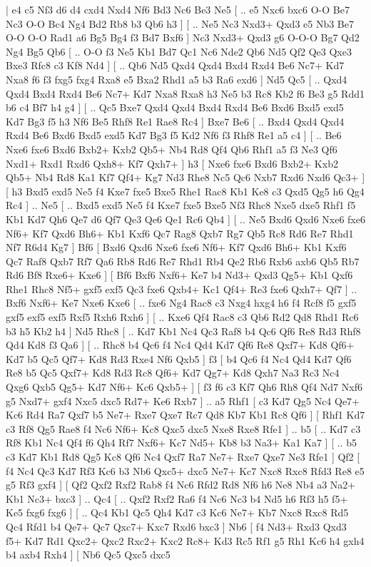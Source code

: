 \makegametitle 
|   e4   c5    Nf3   d6    d4   cxd4    Nxd4   Nf6    Bd3   Nc6    Be3   Ne5 [ .. e5  Nxc6 bxc6  O-O Be7  Nc3 O-O  Bc4 Ng4  Bd2 Rb8  b3 Qb6  h3   ]  [ .. Ne5  Nc3 Nxd3+  Qxd3 e5  Nb3 Be7  O-O O-O  Rad1 a6  Bg5 Bg4  f3 Bd7  Bxf6   ]  Nc3   Nxd3+    Qxd3   g6    O-O-O   Bg7    Qd2   Ng4    Bg5   Qb6 [ .. O-O  f3 Ne5  Kb1 Bd7  Qc1 Nc6  Nde2 Qb6  Nd5 Qf2  Qe3 Qxe3  Bxe3 Rfc8  c3 Kf8  Nd4   ]  [ .. Qb6  Nd5 Qxd4  Qxd4 Bxd4  Rxd4 Be6  Nc7+ Kd7  Nxa8 f6  f3 fxg5  fxg4 Rxa8  e5 Bxa2  Rhd1 a5  b3 Ra6  exd6   ]  Nd5   Qc5 [ .. Qxd4  Qxd4 Bxd4  Rxd4 Be6  Nc7+ Kd7  Nxa8 Rxa8  h3 Ne5  b3 Rc8  Kb2 f6  Be3 g5  Rdd1 b6  c4 Bf7  h4 g4   ]  [ .. Qc5  Bxe7 Qxd4  Qxd4 Bxd4  Rxd4 Be6  Bxd6 Bxd5  exd5 Kd7  Bg3 f5  h3 Nf6  Be5 Rhf8  Re1 Rae8  Rc4   ]  Bxe7   Be6 [ .. Bxd4  Qxd4 Qxd4  Rxd4 Be6  Bxd6 Bxd5  exd5 Kd7  Bg3 f5  Kd2 Nf6  f3 Rhf8  Re1 a5  c4   ]  [ .. Be6  Nxe6 fxe6  Bxd6 Bxb2+  Kxb2 Qb5+  Nb4 Rd8  Qf4 Qb6  Rhf1 a5  f3 Ne3  Qf6 Nxd1+  Rxd1 Rxd6  Qxh8+ Kf7  Qxh7+   ]  h3 [  Nxe6 fxe6  Bxd6 Bxb2+  Kxb2 Qb5+  Nb4 Rd8  Ka1 Kf7  Qf4+ Kg7  Nd3 Rhe8  Nc5 Qc6  Nxb7 Rxd6  Nxd6 Qc3+   ]  [  h3 Bxd5  exd5 Ne5  f4 Kxe7  fxe5 Bxe5  Rhe1 Rac8  Kb1 Ke8  c3 Qxd5  Qg5 h6  Qg4 Rc4   ] .. Ne5 [ .. Bxd5  exd5 Ne5  f4 Kxe7  fxe5 Bxe5  Nf3 Rhc8  Nxe5 dxe5  Rhf1 f5  Kb1 Kd7  Qh6 Qe7  d6 Qf7  Qe3 Qe6  Qe1 Rc6  Qb4   ]  [ .. Ne5  Bxd6 Qxd6  Nxe6 fxe6  Nf6+ Kf7  Qxd6 Bh6+  Kb1 Kxf6  Qc7 Rag8  Qxb7 Rg7  Qb5 Rc8  Rd6 Re7  Rhd1 Nf7  R6d4 Kg7   ]  Bf6 [  Bxd6 Qxd6  Nxe6 fxe6  Nf6+ Kf7  Qxd6 Bh6+  Kb1 Kxf6  Qc7 Raf8  Qxb7 Rf7  Qa6 Rb8  Rd6 Re7  Rhd1 Rb4  Qe2 Rb6  Rxb6 axb6  Qb5 Rb7  Rd6 Bf8  Rxe6+ Kxe6   ]  [  Bf6 Bxf6  Nxf6+ Ke7  b4 Nd3+  Qxd3 Qg5+  Kb1 Qxf6  Rhe1 Rhc8  Nf5+ gxf5  exf5 Qc3  fxe6 Qxb4+  Kc1 Qf4+  Re3 fxe6  Qxh7+ Qf7   ] .. Bxf6    Nxf6+   Ke7    Nxe6   Kxe6 [ .. fxe6  Ng4 Rac8  c3 Nxg4  hxg4 h6  f4 Rcf8  f5 gxf5  gxf5 exf5  exf5 Rxf5  Rxh6 Rxh6   ]  [ .. Kxe6  Qf4 Rac8  c3 Qb6  Rd2 Qd8  Rhd1 Rc6  b3 h5  Kb2 h4   ]  Nd5   Rhc8 [ .. Kd7  Kb1 Nc4  Qc3 Raf8  b4 Qc6  Qf6 Re8  Rd3 Rhf8  Qd4 Kd8  f3 Qa6   ]  [ .. Rhc8  b4 Qc6  f4 Nc4  Qd4 Kd7  Qf6 Re8  Qxf7+ Kd8  Qf6+ Kd7  b5 Qc5  Qf7+ Kd8  Rd3 Rxe4  Nf6 Qxb5   ]  f3 [  b4 Qc6  f4 Nc4  Qd4 Kd7  Qf6 Re8  b5 Qc5  Qxf7+ Kd8  Rd3 Rc8  Qf6+ Kd7  Qg7+ Kd8  Qxh7 Na3  Rc3 Nc4  Qxg6 Qxb5  Qg5+ Kd7  Nf6+ Kc6  Qxb5+   ]  [  f3 f6  c3 Kf7  Qh6 Rh8  Qf4 Nd7  Nxf6 g5  Nxd7+ gxf4  Nxc5 dxc5  Rd7+ Ke6  Rxb7   ] .. a5    Rhf1 [  c3 Kd7  Qg5 Nc4  Qe7+ Kc6  Rd4 Ra7  Qxf7 b5  Ne7+ Rxe7  Qxe7 Rc7  Qd8 Kb7  Kb1 Rc8  Qf6   ]  [  Rhf1 Kd7  c3 Rf8  Qg5 Rae8  f4 Nc6  Nf6+ Kc8  Qxc5 dxc5  Nxe8 Rxe8  Rfe1   ] .. b5 [ .. Kd7  c3 Rf8  Kb1 Nc4  Qf4 f6  Qh4 Rf7  Nxf6+ Kc7  Nd5+ Kb8  b3 Na3+  Ka1 Ka7   ]  [ .. b5  c3 Kd7  Kb1 Rd8  Qg5 Kc8  Qf6 Nc4  Qxf7 Ra7  Ne7+ Rxe7  Qxe7 Ne3  Rfe1   ]  Qf2 [  f4 Nc4  Qc3 Kd7  Rf3 Kc6  b3 Nb6  Qxc5+ dxc5  Ne7+ Kc7  Nxc8 Rxc8  Rfd3 Re8  e5 g5  Rf3 gxf4   ]  [  Qf2 Qxf2  Rxf2 Rab8  f4 Nc6  Rfd2 Rd8  Nf6 h6  Ne8 Nb4  a3 Na2+  Kb1 Nc3+  bxc3   ] .. Qc4 [ .. Qxf2  Rxf2 Ra6  f4 Nc6  Nc3 b4  Nd5 h6  Rf3 h5  f5+ Ke5  fxg6 fxg6   ]  [ .. Qc4  Kb1 Qc5  Qh4 Kd7  c3 Kc6  Ne7+ Kb7  Nxc8 Rxc8  Rd5 Qc4  Rfd1 b4  Qe7+ Qc7  Qxc7+ Kxc7  Rxd6 bxc3   ]  Nb6 [  f4 Nd3+  Rxd3 Qxd3  f5+ Kd7  Rd1 Qxc2+  Qxc2 Rxc2+  Kxc2 Rc8+  Kd3 Rc5  Rf1 g5  Rh1 Kc6  h4 gxh4  b4 axb4  Rxh4   ]  [  Nb6 Qc5  Qxc5 dxc5 